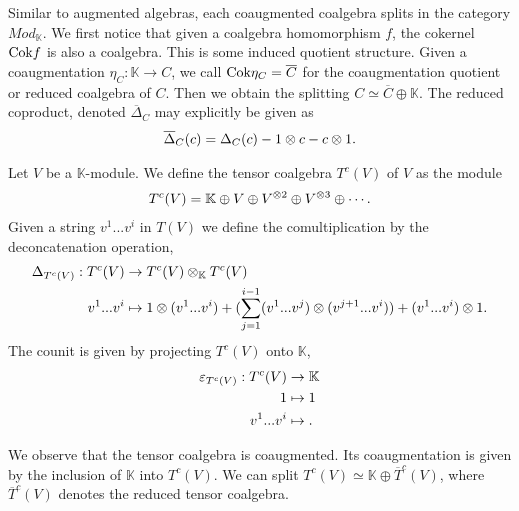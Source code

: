 \documentclass[../thesis.tex]{subfiles}
\begin{document}
            Similar to augmented algebras, each coaugmented coalgebra splits in the category $Mod_\mathbb{K}$. We first notice that given a coalgebra homomorphism $f$, the cokernel $\tt{Cok}f$ is also a coalgebra. This is some induced quotient structure. Given a coaugmentation $\eta_C : \mathbb{K} \rightarrow C$, we call $\tt{Cok}\eta_C = \overline{C}$ for the coaugmentation quotient or reduced coalgebra of $C$. Then we obtain the splitting $C \simeq \overline{C}\oplus\mathbb{K}$. The reduced coproduct, denoted $\overline{\Delta}_C$ may explicitly be given as
            \begin{align*}
                \overline{\Delta}_C(c) = \Delta_C(c) - 1\otimes c - c\otimes 1\tt{.}
            \end{align*}

            \begin{example}
                Let $V$ be a $\mathbb{K}$-module. We define the tensor coalgebra $T^c(V)$ of $V$ as the module
                \begin{align*}
                    T^c(V) = \mathbb{K}\oplus V\oplus V^{\otimes 2}\oplus V^{\otimes 3}\oplus \cdots\tt{.}
                \end{align*}
                Given a string $v^1...v^i$ in $T(V)$ we define the comultiplication by the deconcatenation operation,
                \begin{align*}
                    \Delta_{T^c(V)}:T^c(V) & \rightarrow T^c(V)\otimes_{\mathbb{K}}T^c(V) \\
                    v^1...v^i & \mapsto 1\otimes(v^1...v^i) + (\sum_{j=1}^{i-1} (v^1...v^{j})\otimes(v^{j+1}...v^i)) + (v^1...v^i)\otimes 1\tt{.}
                \end{align*}
                The counit is given by projecting $T^c(V)$ onto $\mathbb{K}$,
                \begin{align*}
                    \varepsilon_{T^c(V)} : T^c(V) & \rightarrow \mathbb{K} \\
                    1 & \mapsto 1 \\
                    v^1...v^i & \mapsto \tt{.}
                \end{align*}
            \end{example}

            We observe that the tensor coalgebra is coaugmented. Its coaugmentation is given by the inclusion of $\mathbb{K}$ into $T^c(V)$. We can split $T^c(V) \simeq \mathbb{K}\oplus \overline{T}^c(V)$, where $\overline{T}^c(V)$ denotes the reduced tensor coalgebra.
\end{document}

